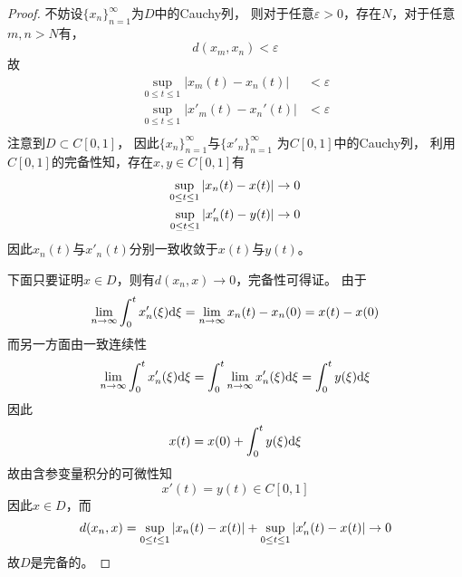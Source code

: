 \documentclass[cn]{homework}
\begin{document}
\begin{subproblem}
        \item
        \begin{proof}
            \newcommand{\xmn}{|x_m(t)-x_n(t)|}
            \newcommand{\xmnp}{|x'_m(t)-x_n'(t)|}
            不妨设$\{x_n\}_{n=1}^\infty$为$D$中的Cauchy列，
            则对于任意$\varepsilon>0$，存在$N$，对于任意$m,n>N$有，
            \[d(x_m,x_n)<\varepsilon\]
            故
            \begin{align*}
                \sup_{0\leq t\leq 1}\xmn&<\varepsilon\\
                \sup_{0\leq t\leq 1}\xmnp&<\varepsilon\\
            \end{align*}
            注意到$D\subset C[0,1]$，
            因此$\{x_n\}_{n=1}^\infty$与$\{x'_n\}_{n=1}^\infty$
            为$C[0,1]$中的Cauchy列，
            利用$C[0,1]$的完备性知，存在$x,y\in C[0,1]$有
            \begin{align*}
                \sup_{0\leq t\leq 1}|x_n(t)-x(t)|&\to 0\\
                \sup_{0\leq t\leq 1}|x'_n(t)-y(t)|&\to 0
            \end{align*}
            因此$x_n(t)$与$x'_n(t)$分别一致收敛于$x(t)$与$y(t)$。

            下面只要证明$x\in D$，则有$d(x_n,x)\to 0$，完备性可得证。
            由于
            \[\lim_{n\to\infty}\int_0^tx'_n(\xi)\mathrm d\xi
            =\lim_{n\to\infty}x_n(t)-x_n(0)=x(t)-x(0)\]
            而另一方面由一致连续性
            \[\lim_{n\to\infty}\int_0^tx'_n(\xi)\mathrm d\xi
            =\int_0^t\lim_{n\to\infty}x'_n(\xi)\mathrm d\xi
            =\int_0^ty(\xi)\mathrm d\xi\]
            因此
            \[x(t)=x(0)+\int_0^ty(\xi)\mathrm d\xi\]
            故由含参变量积分的可微性知
            \[x'(t)=y(t)\in C[0,1]\]
            因此$x\in D$，而
            \[d(x_n,x)=\sup_{0\leq t\leq 1}|x_n(t)-x(t)|
            +\sup_{0\leq t\leq 1}|x_n'(t)-x(t)|
            \to 0\]
            故$D$是完备的。
        \end{proof}
    \end{subproblem}
\end{document}
